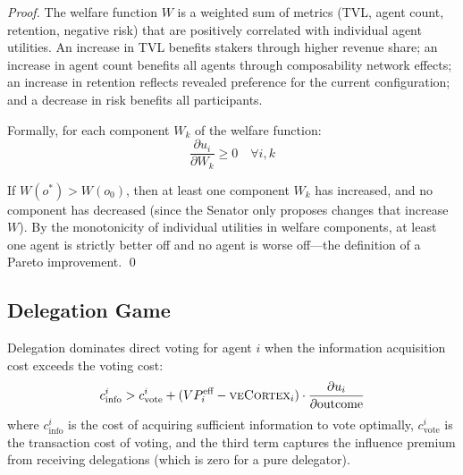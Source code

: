 \begin{proof}
The welfare function $W$ is a weighted sum of metrics (TVL, agent count,
retention, negative risk) that are positively correlated with individual agent
utilities. An increase in TVL benefits stakers through higher revenue share; an
increase in agent count benefits all agents through composability network
effects; an increase in retention reflects revealed preference for the current
configuration; and a decrease in risk benefits all participants.

Formally, for each component $W_k$ of the welfare function:
\begin{equation}
  \frac{\partial u_i}{\partial W_k} \geq 0 \quad \forall i, k
  \label{eq:welfare-monotone}
\end{equation}

If $W(o^*) > W(o_0)$, then at least one component $W_k$ has increased, and no
component has decreased (since the Senator only proposes changes that increase
$W$). By the monotonicity of individual utilities in welfare components, at
least one agent is strictly better off and no agent is worse off---the
definition of a Pareto improvement. \qed
\end{proof}

\subsection{Delegation Game}
\label{subsec:delegation-game}

\begin{proposition}
\label{prop:delegation}
Delegation dominates direct voting for agent $i$ when the information
acquisition cost exceeds the voting cost:
\begin{equation}
  c_{\text{info}}^i > c_{\text{vote}}^i + (VP_i^{\text{eff}} - \textsc{veCortex}_i) \cdot \frac{\partial u_i}{\partial \text{outcome}}
  \label{eq:delegation-condition}
\end{equation}
where $c_{\text{info}}^i$ is the cost of acquiring sufficient information to
vote optimally, $c_{\text{vote}}^i$ is the transaction cost of voting, and the
third term captures the influence premium from receiving delegations (which is
zero for a pure delegator).
\end{proposition}

